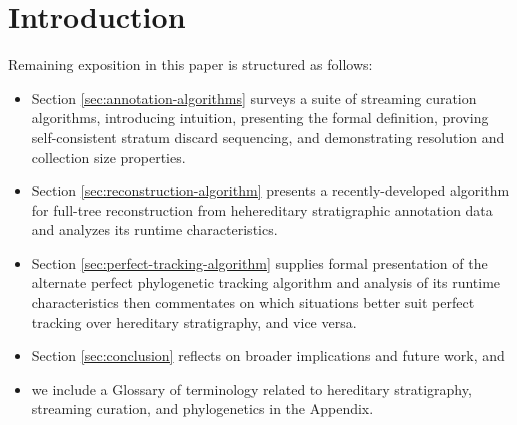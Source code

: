 \section{Introduction} \label{sec:introduction}







Remaining exposition in this paper is structured as follows:
\begin{itemize}
\item Section \ref{sec:annotation-algorithms} surveys a suite of streaming curation algorithms, introducing intuition, presenting the formal definition, proving self-consistent stratum discard sequencing, and demonstrating resolution and collection size properties.
\item Section \ref{sec:reconstruction-algorithm} presents a recently-developed algorithm for full-tree reconstruction from hehereditary stratigraphic annotation data and analyzes its runtime characteristics.
\item Section \ref{sec:perfect-tracking-algorithm} supplies formal presentation of the alternate perfect phylogenetic tracking algorithm and analysis of its runtime characteristics then commentates on which situations better suit perfect tracking over hereditary stratigraphy, and vice versa.
\item Section \ref{sec:conclusion} reflects on broader implications and future work, and
\item we include a Glossary of terminology related to hereditary stratigraphy, streaming curation, and phylogenetics in the Appendix.
\end{itemize}
